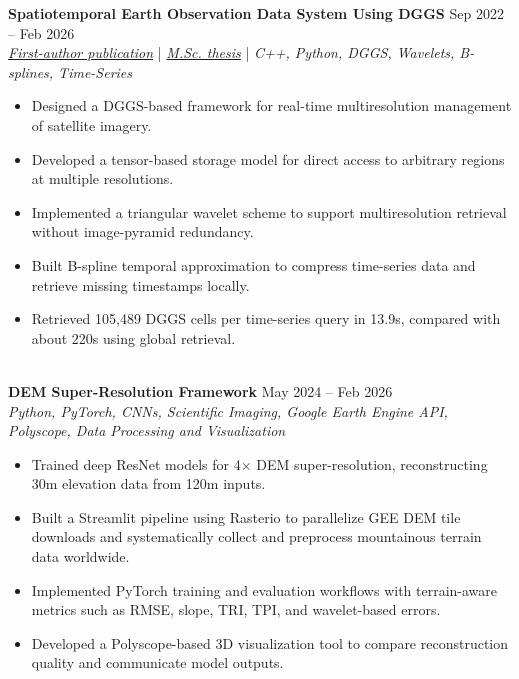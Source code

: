\documentclass[a4paper,10pt]{article}
\begin{document}
\noindent
\textbf{Spatiotemporal Earth Observation Data System Using DGGS} \hfill Sep 2022 -- Feb 2026 \\
\textit{\href{https://doi.org/10.3390/rs17040570}{First-author publication}} | \textit{\href{https://ucalgary.scholaris.ca/items/114b394b-e516-4732-bd3a-45dd6160d480}{M.Sc. thesis}} | \textit{C++, Python, DGGS, Wavelets, B-splines, Time-Series}
\begin{itemize}[leftmargin=0.25in]
    \item Designed a DGGS-based framework for real-time multiresolution management of satellite imagery.
    \item Developed a tensor-based storage model for direct access to arbitrary regions at multiple resolutions.
    \item Implemented a triangular wavelet scheme to support multiresolution retrieval without image-pyramid redundancy.
    \item Built B-spline temporal approximation to compress time-series data and retrieve missing timestamps locally.
    \item Retrieved 105,489 DGGS cells per time-series query in 13.9s, compared with about 220s using global retrieval.
\end{itemize}

\noindent \\
\textbf{DEM Super-Resolution Framework} \hfill May 2024 -- Feb 2026 \\
\textit{Python, PyTorch, CNNs, Scientific Imaging, Google Earth Engine API, Polyscope, Data Processing and Visualization}
\begin{itemize}[leftmargin=0.25in]
    \item Trained deep ResNet models for 4$\times$ DEM super-resolution, reconstructing 30m elevation data from 120m inputs.
    \item Built a Streamlit pipeline using Rasterio to parallelize GEE DEM tile downloads and systematically collect and preprocess mountainous terrain data worldwide.
    \item Implemented PyTorch training and evaluation workflows with terrain-aware metrics such as RMSE, slope, TRI, TPI, and wavelet-based errors.
    \item Developed a Polyscope-based 3D visualization tool to compare reconstruction quality and communicate model outputs.
\end{itemize}
\end{document}
